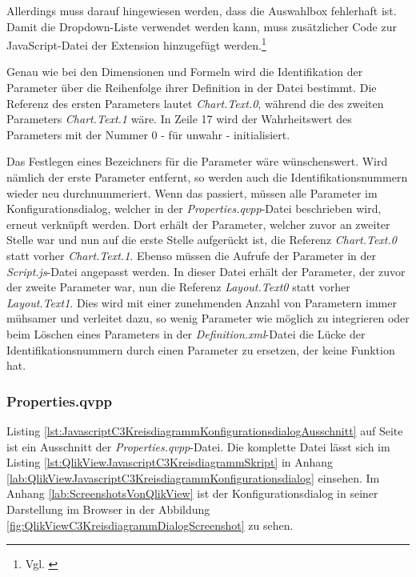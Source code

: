 Allerdings muss darauf hingewiesen werden, dass die Auswahlbox fehlerhaft ist. Damit die Dropdown-Liste verwendet werden kann, muss zusätzlicher Code zur JavaScript-Datei der Extension hinzugefügt werden.\footnote{Vgl. \cite{HTMLSelectInExtensionsQlikCommunity}}

Genau wie bei den Dimensionen und Formeln wird die Identifikation der Parameter über die Reihenfolge ihrer Definition in der Datei bestimmt. Die Referenz des ersten Parameters lautet \textit{Chart.Text.0}, während die des zweiten Parameters \textit{Chart.Text.1} wäre. In Zeile 17 wird der Wahrheits\-wert des Parameters mit der Nummer 0 - für unwahr - initialisiert. 

Das Festlegen eines Bezeichners für die Parameter wäre wünschenswert. Wird nämlich der erste Parameter entfernt, so werden auch die Identifikationsnummern wieder neu durch\-nummeriert. Wenn das passiert, müssen alle Parameter im Konfigurationsdialog, welcher in der \textit{Properties.qvpp}-Datei beschrieben wird, erneut verknüpft werden. Dort erhält der Parameter, welcher zuvor an zweiter Stelle war und nun auf die erste Stelle aufgerückt ist, die Referenz \textit{Chart.Text.0} statt vorher \textit{Chart.Text.1}. Ebenso müssen die Aufrufe der Parameter in der \textit{Script.js}-Datei angepasst werden. In dieser Datei erhält der Parameter, der zuvor der zweite Parameter war, nun die Referenz \textit{Layout.Text0} statt vorher \textit{Layout.Text1}. Dies wird mit einer zunehmenden Anzahl von Parametern immer mühsamer und verleitet dazu, so wenig Parameter wie möglich zu integrieren oder beim Löschen eines Parameters in der \textit{Definition.xml}-Datei die Lücke der Identifikationsnummern durch einen Parameter zu ersetzen, der keine Funktion hat. 

\subsubsection{Properties.qvpp}

Listing \ref{lst:JavascriptC3KreisdiagrammKonfigurationsdialogAusschnitt} auf Seite \pageref{lst:JavascriptC3KreisdiagrammKonfigurationsdialogAusschnitt} ist ein Ausschnitt der \textit{Properties.qvpp}-Datei. Die komplette Datei lässt sich im Listing \ref{lst:QlikViewJavascriptC3KreisdiagrammSkript} in Anhang \ref{lab:QlikViewJavascriptC3KreisdiagrammKonfigurationsdialog} einsehen. Im Anhang \ref{lab:ScreenshotsVonQlikView} ist der Konfigurations\-dialog in seiner Darstellung im Browser in der Abbildung \ref{fig:QlikViewC3KreisdiagrammDialogScreenshot} zu sehen.

